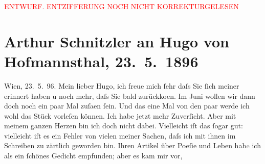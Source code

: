 
\begin{center}
            \textcolor{red}{ENTWURF. ENTZIFFERUNG NOCH NICHT KORREKTURGELESEN}
                      \end{center}
            
               \section[Arthur Schnitzler an Hugo von Hofmannsthal, 23. 5. 1896]{ Arthur Schnitzler an Hugo von Hofmannsthal, 23. 5. 1896}\nopagebreak{}\rehead{ }\begin{ledgroupsized}[t]{13cm}\normalsize\beginnumbering{} \toendnotes[C]{\smallbreak\pagebreak[2]} 
\toendnotes[C]{\smallbreak}\pstart
           \raggedleft{}{\pb}Wien, 23. 5. 96.\pend
           \pstart
           Mein lieber Hugo, ich freue mich ſehr daſs Sie ſich meiner
                    erinnert haben u noch mehr, daſs Sie bald zurückko{\geminationm}en. Im Juni wollen wir dann doch noch ein paar Mal zuſa{\geminationm}en ſein. Und das eine Mal von den paar werde ich
                    wohl das Stück vorleſen
                    können. Ich habe jetzt mehr Zuverſicht. Aber mit meinem ganzen Herzen bin ich
                    doch nicht dabei. Vielleicht iſt das ſogar gut: vielleicht {\pb}iſt es ein Fehler von vielen meiner Sachen, daſs ich
                    mit ihnen im Schreiben zu zärtlich geworden bin.\pend
           \pstart
           Ihren Artikel über Poeſie und
                        Leben hab\textcolor{gray}{e} ich als ein ſchönes Gedicht empfunden; aber es kam mir vor,

\end{ledgroupsized}
